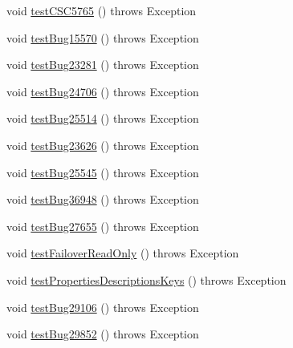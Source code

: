 \begin{DoxyCompactItemize}
\item 
void \mbox{\hyperlink{classtestsuite_1_1regression_1_1_connection_regression_test_af644cda8d5a41554a16554e2a7c2340c}{test\+C\+S\+C5765}} ()  throws Exception 
\item 
void \mbox{\hyperlink{classtestsuite_1_1regression_1_1_connection_regression_test_a9a041d23bb6273cd7e366bede52eea56}{test\+Bug15570}} ()  throws Exception 
\item 
void \mbox{\hyperlink{classtestsuite_1_1regression_1_1_connection_regression_test_a677e7bbd5b69eecc56a23dab94b43440}{test\+Bug23281}} ()  throws Exception 
\item 
void \mbox{\hyperlink{classtestsuite_1_1regression_1_1_connection_regression_test_a8b623f119364af8388c15700cc8751be}{test\+Bug24706}} ()  throws Exception 
\item 
void \mbox{\hyperlink{classtestsuite_1_1regression_1_1_connection_regression_test_adbc6d893aaac816110cf40953338eead}{test\+Bug25514}} ()  throws Exception 
\item 
void \mbox{\hyperlink{classtestsuite_1_1regression_1_1_connection_regression_test_a0fda786f7ab6f9338c7dd469a8e617fa}{test\+Bug23626}} ()  throws Exception 
\item 
void \mbox{\hyperlink{classtestsuite_1_1regression_1_1_connection_regression_test_a98a44b0432aebd94026747e6fce76282}{test\+Bug25545}} ()  throws Exception 
\item 
void \mbox{\hyperlink{classtestsuite_1_1regression_1_1_connection_regression_test_a7d937c6b4d025862d519876bc472989b}{test\+Bug36948}} ()  throws Exception 
\item 
void \mbox{\hyperlink{classtestsuite_1_1regression_1_1_connection_regression_test_a02d58a66068ff4c5f9fa6c77ebf3b50f}{test\+Bug27655}} ()  throws Exception 
\item 
void \mbox{\hyperlink{classtestsuite_1_1regression_1_1_connection_regression_test_a9b67a76ffbc55986621776106705e212}{test\+Failover\+Read\+Only}} ()  throws Exception 
\item 
void \mbox{\hyperlink{classtestsuite_1_1regression_1_1_connection_regression_test_a4a60dfecc7a7a0c46f4777b2495f98ca}{test\+Properties\+Descriptions\+Keys}} ()  throws Exception 
\item 
void \mbox{\hyperlink{classtestsuite_1_1regression_1_1_connection_regression_test_a767a29b2ab38b79b89df97f650fd78cb}{test\+Bug29106}} ()  throws Exception 
\item 
void \mbox{\hyperlink{classtestsuite_1_1regression_1_1_connection_regression_test_acfd6776a367a9af1afbd3e06b63801f1}{test\+Bug29852}} ()  throws Exception 

\end{DoxyCompactItemize}
